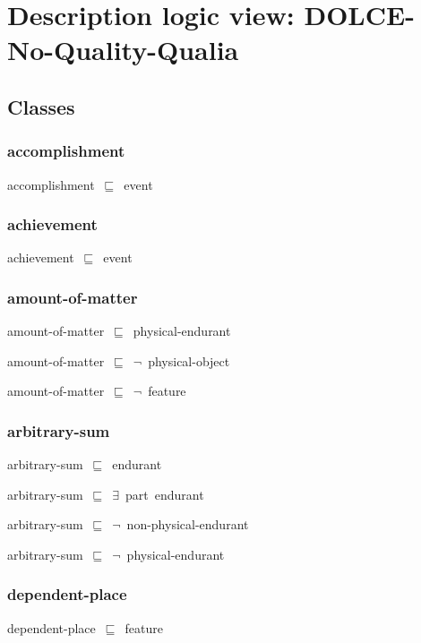 \documentclass{article}
\begin{document}
\section*{Description logic view: DOLCE-No-Quality-Qualia}

\subsection*{Classes}


\subsubsection*{accomplishment}

accomplishment~\ensuremath{\sqsubseteq}~event~

\subsubsection*{achievement}

achievement~\ensuremath{\sqsubseteq}~event~

\subsubsection*{amount-of-matter}

amount-of-matter~\ensuremath{\sqsubseteq}~physical-endurant~

amount-of-matter~\ensuremath{\sqsubseteq}~\ensuremath{\lnot}~physical-object

amount-of-matter~\ensuremath{\sqsubseteq}~\ensuremath{\lnot}~feature

\subsubsection*{arbitrary-sum}

arbitrary-sum~\ensuremath{\sqsubseteq}~endurant~

arbitrary-sum~\ensuremath{\sqsubseteq}~\ensuremath{\exists}~part~endurant~

arbitrary-sum~\ensuremath{\sqsubseteq}~\ensuremath{\lnot}~non-physical-endurant

arbitrary-sum~\ensuremath{\sqsubseteq}~\ensuremath{\lnot}~physical-endurant

\subsubsection*{dependent-place}

dependent-place~\ensuremath{\sqsubseteq}~feature~
\end{document}
